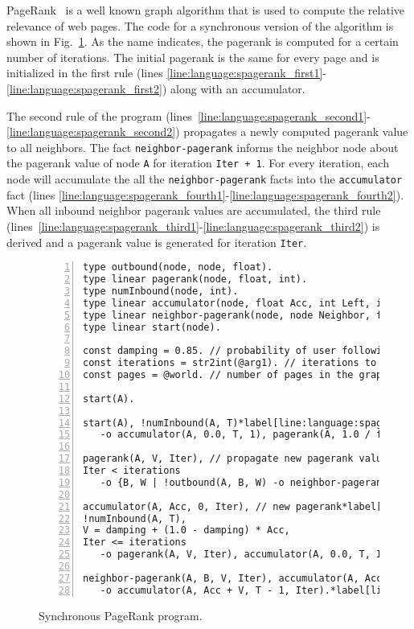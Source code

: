 PageRank~\cite{Page:2001:MNR} is a well known graph algorithm that is used to
compute the relative relevance of web pages.  The code for a synchronous version
of the algorithm is shown in Fig.~\ref{language:code:pagerank}. As the name
indicates, the pagerank is computed for a certain number of iterations. The
initial pagerank is the same for every page and is initialized in the first rule
(lines
\ref{line:language:spagerank_first1}-\ref{line:language:spagerank_first2}) along
with an accumulator.

The second rule of the program
(lines~\ref{line:language:spagerank_second1}-\ref{line:language:spagerank_second2})
propagates a newly computed pagerank value to all neighbors. The fact
\texttt{neighbor-pagerank} informs the neighbor node about the pagerank value of
node \texttt{A} for iteration \texttt{Iter + 1}. For every iteration, each node
will accumulate the all the \texttt{neighbor-pagerank} facts into the
\texttt{accumulator} fact (lines
\ref{line:language:spagerank_fourth1}-\ref{line:language:spagerank_fourth2}).
When all inbound neighbor pagerank values are accumulated, the third rule
(lines~\ref{line:language:spagerank_third1}-\ref{line:language:spagerank_third2})
is derived and a pagerank value is generated for iteration \texttt{Iter}.

\begin{figure}[h!]
\begin{Verbatim}[numbers=left,fontsize=\codesize,commandchars=\*\[\]]
type outbound(node, node, float).
type linear pagerank(node, float, int).
type numInbound(node, int).
type linear accumulator(node, float Acc, int Left, int Iteration).
type linear neighbor-pagerank(node, node Neighbor, float Rank, int Iteration).
type linear start(node).

const damping = 0.85. // probability of user following a link in the current page.
const iterations = str2int(@arg1). // iterations to compute.
const pages = @world. // number of pages in the graph.

start(A).

start(A), !numInbound(A, T)*label[line:language:spagerank_first1]
   -o accumulator(A, 0.0, T, 1), pagerank(A, 1.0 / float(pages), 0).*label[line:language:spagerank_first2]

pagerank(A, V, Iter), // propagate new pagerank value*label[line:language:spagerank_second1]
Iter < iterations
   -o {B, W | !outbound(A, B, W) -o neighbor-pagerank(B, A, V * W, Iter + 1)}.*label[line:language:spagerank_second2]

accumulator(A, Acc, 0, Iter), // new pagerank*label[line:language:spagerank_third1]
!numInbound(A, T),
V = damping + (1.0 - damping) * Acc,
Iter <= iterations
   -o pagerank(A, V, Iter), accumulator(A, 0.0, T, Iter + 1).*label[line:language:spagerank_third2]
	
neighbor-pagerank(A, B, V, Iter), accumulator(A, Acc, T, Iter)*label[line:language:spagerank_fourth1]
   -o accumulator(A, Acc + V, T - 1, Iter).*label[line:language:spagerank_fourth2]
\end{Verbatim}
\caption{Synchronous PageRank program.}
\label{language:code:pagerank}
\end{figure}

